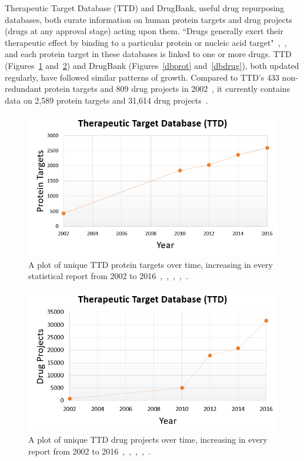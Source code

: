 \documentclass{IEEEtran}
\begin{document}
		Therapeutic Target Database (TTD) and DrugBank, useful drug repurposing databases, both curate information on human protein targets and drug projects (drugs at any approval stage) acting upon them.  ``Drugs generally exert their therapeutic effect by binding to a particular protein or nucleic acid target"~\cite{ttd02},~\cite{drugbank06}, and each protein target in these databases is linked to one or more drugs. TTD (Figures~\ref{ttdprot} and~\ref{ttddrug}) and DrugBank (Figures~\ref{dbprot} and~\ref{dbdrug}), both updated regularly, have followed similar patterns of growth.  Compared to TTD's 433 non-redundant protein targets and 809 drug projects in 2002~\cite{ttd02}, it currently contains data on 2,589 protein targets and 31,614 drug projects~\cite{ttd16}. 
		
				\begin{figure}[h]
					\centering
					\includegraphics[width=\linewidth]{ttdprot}
					\caption{\footnotesize A plot of unique TTD protein targets over time, increasing in every statistical report from 2002 to 2016~\cite{ttd02},~\cite{ttd14},~\cite{ttd16},~\cite{ttd10},~\cite{ttd12}.}
					\label{ttdprot}
				\end{figure} 
				\begin{figure}[h]
					\centering
					\includegraphics[width=\linewidth]{ttddrug}
					\caption{\footnotesize A plot of unique TTD drug projects over time, increasing in every report from 2002 to 2016~\cite{ttd02},~\cite{ttd14},~\cite{ttd16},~\cite{ttd10},~\cite{ttd12}.}
					\label{ttddrug}
				\end{figure}
\end{document}
